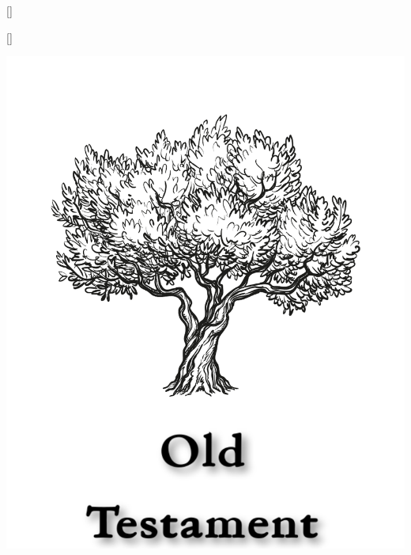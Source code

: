 
\titleformat{\section}[hang]{\bfseries\huge}{}{0ex}{}[]
% 
\titleformat{\section}[wrap]{\bfseries\huge}{}{0ex}{}[]
\newpage

\tableofcontents
\newpage

\null\vfill
\begin{center}
\begin{minipage}[c]{\textwidth}
  \begin{center}
  \includegraphics{OldTestamentTitle.pdf}
  \end{center}
\end{minipage}
\end{center}
\null\vfill
\newpage

\pagestyle{bible}

\renewcommand{\cleardoublepage}{\clearpage}

